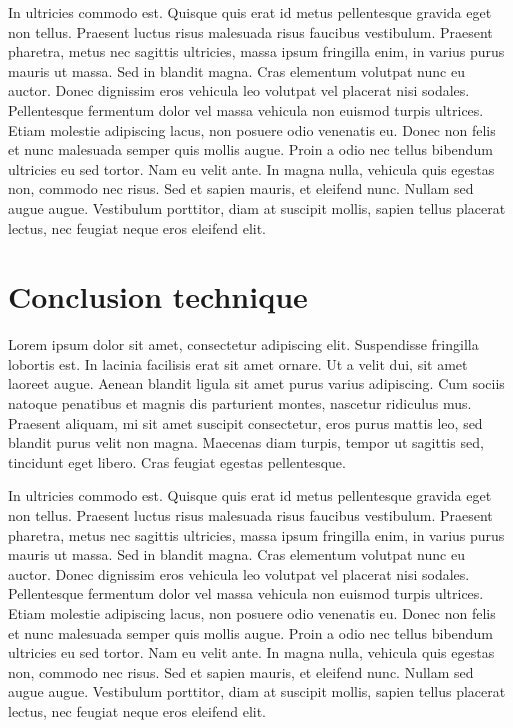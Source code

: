 \documentclass[a4paper,12pt]{report}
\begin{document}
In ultricies commodo est. Quisque quis erat id metus pellentesque
gravida eget non tellus. Praesent luctus risus malesuada risus
faucibus vestibulum. Praesent pharetra, metus nec sagittis ultricies,
massa ipsum fringilla enim, in varius purus mauris ut massa. Sed in
blandit magna. Cras elementum volutpat nunc eu auctor. Donec dignissim
eros vehicula leo volutpat vel placerat nisi sodales. Pellentesque
fermentum dolor vel massa vehicula non euismod turpis ultrices. Etiam
molestie adipiscing lacus, non posuere odio venenatis eu. Donec non
felis et nunc malesuada semper quis mollis augue. Proin a odio nec
tellus bibendum ultricies eu sed tortor. Nam eu velit ante. In magna
nulla, vehicula quis egestas non, commodo nec risus. Sed et sapien
mauris, et eleifend nunc. Nullam sed augue augue. Vestibulum
porttitor, diam at suscipit mollis, sapien tellus placerat lectus, nec
feugiat neque eros eleifend elit.

\section*{Conclusion technique}
Lorem ipsum dolor sit amet, consectetur adipiscing elit. Suspendisse
fringilla lobortis est. In lacinia facilisis erat sit amet ornare. Ut
a velit dui, sit amet laoreet augue. Aenean blandit ligula sit amet
purus varius adipiscing. Cum sociis natoque penatibus et magnis dis
parturient montes, nascetur ridiculus mus. Praesent aliquam, mi sit
amet suscipit consectetur, eros purus mattis leo, sed blandit purus
velit non magna. Maecenas diam turpis, tempor ut sagittis sed,
tincidunt eget libero. Cras feugiat egestas pellentesque.

In ultricies commodo est. Quisque quis erat id metus pellentesque
gravida eget non tellus. Praesent luctus risus malesuada risus
faucibus vestibulum. Praesent pharetra, metus nec sagittis ultricies,
massa ipsum fringilla enim, in varius purus mauris ut massa. Sed in
blandit magna. Cras elementum volutpat nunc eu auctor. Donec dignissim
eros vehicula leo volutpat vel placerat nisi sodales. Pellentesque
fermentum dolor vel massa vehicula non euismod turpis ultrices. Etiam
molestie adipiscing lacus, non posuere odio venenatis eu. Donec non
felis et nunc malesuada semper quis mollis augue. Proin a odio nec
tellus bibendum ultricies eu sed tortor. Nam eu velit ante. In magna
nulla, vehicula quis egestas non, commodo nec risus. Sed et sapien
mauris, et eleifend nunc. Nullam sed augue augue. Vestibulum
porttitor, diam at suscipit mollis, sapien tellus placerat lectus, nec
feugiat neque eros eleifend elit.
\end{document}
